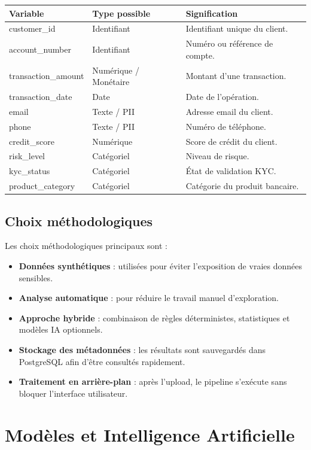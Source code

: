 \documentclass[12pt,a4paper]{report}
\begin{document}
\begin{longtable}{p{4cm}p{4cm}p{6cm}}
\toprule
\textbf{Variable} & \textbf{Type possible} & \textbf{Signification} \\
\midrule
customer\_id & Identifiant & Identifiant unique du client. \\
account\_number & Identifiant & Numéro ou référence de compte. \\
transaction\_amount & Numérique / Monétaire & Montant d'une transaction. \\
transaction\_date & Date & Date de l'opération. \\
email & Texte / PII & Adresse email du client. \\
phone & Texte / PII & Numéro de téléphone. \\
credit\_score & Numérique & Score de crédit du client. \\
risk\_level & Catégoriel & Niveau de risque. \\
kyc\_status & Catégoriel & État de validation KYC. \\
product\_category & Catégoriel & Catégorie du produit bancaire. \\
\bottomrule
\end{longtable}

\section{Choix méthodologiques}

Les choix méthodologiques principaux sont :

\begin{itemize}
    \item \textbf{Données synthétiques} : utilisées pour éviter l'exposition de vraies données sensibles.
    \item \textbf{Analyse automatique} : pour réduire le travail manuel d'exploration.
    \item \textbf{Approche hybride} : combinaison de règles déterministes, statistiques et modèles IA optionnels.
    \item \textbf{Stockage des métadonnées} : les résultats sont sauvegardés dans PostgreSQL afin d'être consultés rapidement.
    \item \textbf{Traitement en arrière-plan} : après l'upload, le pipeline s'exécute sans bloquer l'interface utilisateur.
\end{itemize}

\chapter{Modèles et Intelligence Artificielle}
\end{document}
